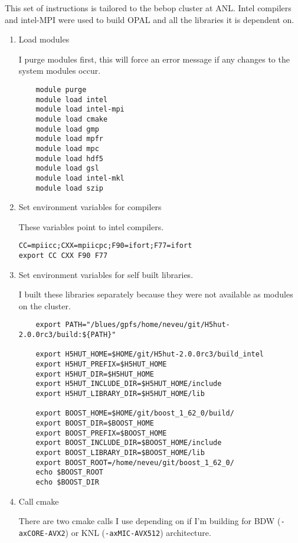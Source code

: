\documentclass[table]{iitthesis}
\begin{document}
 \label{build}
This set of instructions is tailored to the bebop cluster at ANL. 
Intel compilers and intel-MPI were used to build OPAL and all 
the libraries it is dependent on.
\begin{enumerate}[label=Step \arabic*:]
	\item Load modules 

I purge modules first, this will force an error message if any changes
to the system modules occur.
\begin{lstlisting}
	module purge
	module load intel
	module load intel-mpi 
	module load cmake 
	module load gmp   
	module load mpfr  
	module load mpc   
	module load hdf5   
	module load gsl   
	module load intel-mkl
	module load szip
\end{lstlisting}

    \item Set environment variables for compilers 
 
These variables point to intel compilers. 
\begin{lstlisting}
CC=mpiicc;CXX=mpiicpc;F90=ifort;F77=ifort
export CC CXX F90 F77
\end{lstlisting}

    \item Set environment variables for self built libraries.
    
I built these libraries separately because they were not available as 
modules on the cluster. 

\begin{lstlisting}
	export PATH="/blues/gpfs/home/neveu/git/H5hut-2.0.0rc3/build:${PATH}"
	
	export H5HUT_HOME=$HOME/git/H5hut-2.0.0rc3/build_intel
	export H5HUT_PREFIX=$H5HUT_HOME
	export H5HUT_DIR=$H5HUT_HOME
	export H5HUT_INCLUDE_DIR=$H5HUT_HOME/include
	export H5HUT_LIBRARY_DIR=$H5HUT_HOME/lib
	
	export BOOST_HOME=$HOME/git/boost_1_62_0/build/
	export BOOST_DIR=$BOOST_HOME
	export BOOST_PREFIX=$BOOST_HOME
	export BOOST_INCLUDE_DIR=$BOOST_HOME/include
	export BOOST_LIBRARY_DIR=$BOOST_HOME/lib
	export BOOST_ROOT=/home/neveu/git/boost_1_62_0/
	echo $BOOST_ROOT
	echo $BOOST_DIR
\end{lstlisting}

    \item Call cmake 
    
There are two cmake calls I use depending on if I'm building for 
BDW (\verb|-axCORE-AVX2|) or KNL (\verb|-axMIC-AVX512|) architecture. 
    

\end{enumerate}
\end{document}
